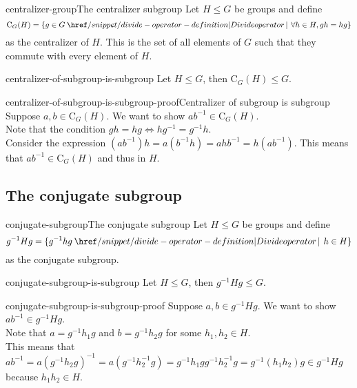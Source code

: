 \documentclass[preview]{standalone}
\begin{document}
\begin{snippetdefinition}{centralizer-group}{The centralizer subgroup}
    Let \(H \leq G\) be groups and define
    \[
        \text{C}_G(H) = \{
            g \in G \divides \forall h \in H, gh=hg
        \}
    \]
    as the centralizer of \(H\).
    This is the set of all elements of \(G\) such that they commute with every element of \(H\).
\end{snippetdefinition}

\begin{snippettheorem}{centralizer-of-subgroup-is-subgroup}{}
    Let \(H \leq G\), then \(\text{C}_G(H) \leq G\).
\end{snippettheorem}

\begin{snippetproof}{centralizer-of-subgroup-is-subgroup-proof}{Centralizer of subgroup is subgroup}
    Suppose \(a,b \in \text{C}_G(H)\).
    We want to show \(ab^{-1} \in \text{C}_G(H)\).\\
    Note that the condition \(gh=hg \iff hg^{-1}=g^{-1}h\).\\
    Consider the expression \((ab^{-1})h = a(b^{-1}h) = ahb^{-1} = h(ab^{-1})\).
    This means that \(ab^{-1} \in \text{C}_G(H)\) and thus in \(H\).
\end{snippetproof}

\subsection{The conjugate subgroup}

\begin{snippetdefinition}{conjugate-subgroup}{The conjugate subgroup}
    Let \(H \leq G\) be groups and define
    \[
        g^{-1}Hg = \{
            g^{-1}hg \divides h \in H    
        \}
    \]
    as the conjugate subgroup.
\end{snippetdefinition}

\begin{snippettheorem}{conjugate-subgroup-is-subgroup}{}
    Let \(H \leq G\), then \(g^{-1}Hg \leq G\).
\end{snippettheorem}

\begin{snippetproof}{conjugate-subgroup-is-subgroup-proof}{}
    Suppose \(a,b \in g^{-1}Hg\).
    We want to show \(ab^{-1} \in g^{-1}Hg\).\\
    Note that \(a = g^{-1}h_1g\) and \(b = g^{-1}h_2g\)
    for some \(h_1, h_2 \in H\). \\
    This means that \(ab^{-1}=a{(g^{-1}h_2g)}^{-1} = a(g^{-1}h_2^{-1}g)
    =g^{-1}h_1gg^{-1}h_2^{-1}g = g^{-1} (h_1h_2) g \in g^{-1}Hg \)
    because \(h_1h_2 \in H\).
\end{snippetproof}
\end{document}

